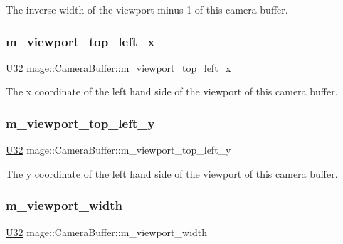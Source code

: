 The inverse width of the viewport minus 1 of this camera buffer. \hypertarget{structmage_1_1_camera_buffer_aa1a4a218d604beb0777e9286daad8c8b}{}\label{structmage_1_1_camera_buffer_aa1a4a218d604beb0777e9286daad8c8b} 
\subsubsection{\texorpdfstring{m\+\_\+viewport\+\_\+top\+\_\+left\+\_\+x}{m\_viewport\_top\_left\_x}}
{\footnotesize\ttfamily \hyperlink{namespacemage_a41c104c036fba3756a74e19f793eeaa1}{U32} mage\+::\+Camera\+Buffer\+::m\+\_\+viewport\+\_\+top\+\_\+left\+\_\+x}

The x coordinate of the left hand side of the viewport of this camera buffer. \hypertarget{structmage_1_1_camera_buffer_af3200b46348fecc86ecca3717767ae6b}{}\label{structmage_1_1_camera_buffer_af3200b46348fecc86ecca3717767ae6b} 
\subsubsection{\texorpdfstring{m\+\_\+viewport\+\_\+top\+\_\+left\+\_\+y}{m\_viewport\_top\_left\_y}}
{\footnotesize\ttfamily \hyperlink{namespacemage_a41c104c036fba3756a74e19f793eeaa1}{U32} mage\+::\+Camera\+Buffer\+::m\+\_\+viewport\+\_\+top\+\_\+left\+\_\+y}

The y coordinate of the left hand side of the viewport of this camera buffer. \hypertarget{structmage_1_1_camera_buffer_a9aec8f6ee54281ae7ec410be846c3658}{}\label{structmage_1_1_camera_buffer_a9aec8f6ee54281ae7ec410be846c3658} 
\subsubsection{\texorpdfstring{m\+\_\+viewport\+\_\+width}{m\_viewport\_width}}
{\footnotesize\ttfamily \hyperlink{namespacemage_a41c104c036fba3756a74e19f793eeaa1}{U32} mage\+::\+Camera\+Buffer\+::m\+\_\+viewport\+\_\+width}

